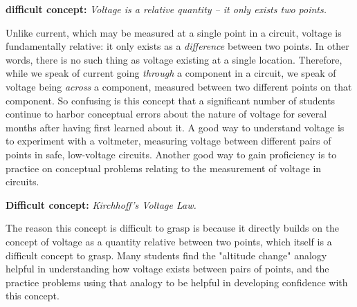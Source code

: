 \vskip 10pt

\noindent
{\bf {} difficult concept: } {\it Voltage is a relative quantity -- it only exists  two points.}

Unlike current, which may be measured at a single point in a circuit, voltage is fundamentally relative: it only exists as a {\it difference} between two points.  In other words, there is no such thing as voltage existing at a single location.  Therefore, while we speak of current going {\it through} a component in a circuit, we speak of voltage being {\it across} a component, measured between two different points on that component.  So confusing is this concept that a significant number of students continue to harbor conceptual errors about the nature of voltage for several months after having first learned about it.  A good way to understand voltage is to experiment with a voltmeter, measuring voltage between different pairs of points in safe, low-voltage circuits.  Another good way to gain proficiency is to practice on conceptual problems relating to the measurement of voltage in circuits.

\vskip 10pt

\noindent
{\bf Difficult concept: } {\it Kirchhoff's Voltage Law.}

The reason this concept is difficult to grasp is because it directly builds on the concept of voltage as a quantity relative between two points, which itself is a difficult concept to grasp.  Many students find the "altitude change" analogy helpful in understanding how voltage exists between pairs of points, and the practice problems using that analogy to be helpful in developing confidence with this concept.


